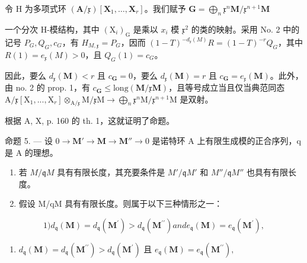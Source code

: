 令 H 为多项式环 \((\mathbf{A} / \mathfrak{x})[\mathbf{X}_1,\dots ,\mathbf{X}_r]\)。我们赋予 \(\mathbf{G} = \bigoplus_{n}\mathfrak{x}^{n}\mathbf{M} / \mathfrak{x}^{n + 1}\mathbf{M}\)

一个分次 H-模结构，其中 \((\mathrm{X}_{i})_{\mathrm{G}}\) 是乘以 \(x_{i}\) 模 \(\mathfrak{x}^{2}\) 的类的映射。采用 No. 2 中的记号 \(P_{G}, Q_{G}, c_{G}\)，有 \(H_{M,\mathfrak{x}} = P_{G}\)，因而 \((1 - T)^{-d_{\mathfrak{x}}(M)}R = (1 - T)^{-r}Q_{G}\)，其中 \(R(1) = e_{\mathfrak{x}}(M) > 0\)，且 \(Q_{G}(1) = c_{G}\)。

因此，要么 \(d_{\mathfrak{x}}(\mathbf{M}) < r\) 且 \(c_{\mathbf{G}} = 0\)，要么 \(d_{\mathfrak{x}}(\mathbf{M}) = r\) 且 \(c_{\mathbf{G}} = e_{\mathfrak{x}}(\mathbf{M})\)。此外，由 no. 2 的 prop. 1，有 \(c_{\mathbf{G}} \leqslant \text{long}(\mathbf{M}/\mathfrak{x}\mathbf{M})\)，且等号成立当且仅当典范同态 \(\mathrm{A}/\mathfrak{x}[\mathrm{X}_{1}, ..., \mathrm{X}_{r}] \otimes_{\mathrm{A}/\mathfrak{x}} \mathrm{M}/\mathfrak{x}\mathrm{M} \to \bigoplus_{n}\mathfrak{x}^{n}\mathrm{M}/\mathfrak{x}^{n+1}\mathrm{M}\) 是双射。

根据 A, X, p. 160 的 th. 1，这就证明了命题。

命题 5. --- 设 \(0 \to \mathbf{M}' \to \mathbf{M} \to \mathbf{M}'' \to 0\) 是诺特环 A 上有限生成模的正合序列，q 是 A 的理想。

\begin{enumerate}
\def\labelenumi{\alph{enumi})}
\item
  若 \(M/\mathfrak{q}M\) 具有有限长度，其充要条件是 \(M'/\mathfrak{q}M'\) 和 \(M''/\mathfrak{q}M''\) 也具有有限长度。
\item
  假设 M/qM 具有有限长度。则属于以下三种情形之一：
\end{enumerate}

\[
1) d _ {\mathfrak {q}} (\mathbf {M}) = d _ {\mathfrak {q}} \left(\mathbf {M} ^ {\prime}\right) > d _ {\mathfrak {q}} \left(\mathbf {M} ^ {\prime \prime}\right) and e _ {\mathfrak {q}} (\mathbf {M}) = e _ {\mathfrak {q}} \left(\mathbf {M} ^ {\prime}\right),
\]

\begin{enumerate}
\def\labelenumi{\arabic{enumi})}
\setcounter{enumi}{1}
\tightlist
\item
  \(d_{\mathfrak{q}}(\mathbf{M}) = d_{\mathfrak{q}}(\mathbf{M}^{\prime \prime}) > d_{\mathfrak{q}}(\mathbf{M}^{\prime})\) 且 \(e_{\mathfrak{q}}(\mathbf{M}) = e_{\mathfrak{q}}(\mathbf{M}^{\prime \prime}),\)
\end{enumerate}

